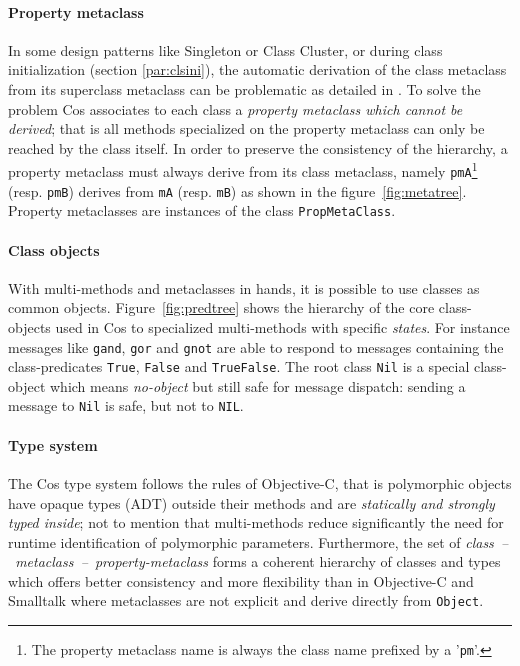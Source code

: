 \documentclass[preprint,10pt]{sigplanconf}
\newcommand{\ProgLang}[1]{{\sc #1}\xspace}
\newcommand{\Cos}       {\ProgLang{Cos}}
\newcommand{\Objc}      {\ProgLang{Objective-C}}
\newcommand{\Smalltalk} {\ProgLang{Smalltalk}}
\newcommand{\code}[1]{\lstinline[language=COS,style=samplecode]|#1|}
\begin{document}
\paragraph{Property metaclass}

In some design patterns like Singleton or Class Cluster, or during class initialization (section \ref{par:clsini}), the automatic derivation of the class metaclass from its superclass metaclass can be problematic as detailed in \cite{bour98}. To solve the problem \Cos associates to each class a {\em property metaclass which cannot be derived}; that is all methods specialized on the property metaclass can only be reached by the class itself. In order to preserve the consistency of the hierarchy, a property metaclass must always derive from its class metaclass, namely \code{pmA}\footnote{The property metaclass name is always the class name prefixed by a '\code{pm}'.}  (resp. \code{pmB}) derives from \code{mA} (resp. \code{mB}) as shown in the figure~\ref{fig:metatree}. Property metaclasses are instances of the class \code{PropMetaClass}.

\paragraph{Class objects}

With multi-methods and metaclasses in hands, it is possible to use classes as common objects. Figure~\ref{fig:predtree} shows the hierarchy of the core class-objects used in \Cos to specialized multi-methods with specific {\em states}. For instance messages like \code{gand}, \code{gor} and \code{gnot} are able to respond to messages containing the class-predicates \code{True}, \code{False} and \code{TrueFalse}. The root class \code{Nil} is a special class-object which means {\em no-object} but still safe for message dispatch: sending a message to \code{Nil} is safe, but not to \code{NIL}.

\paragraph{Type system}

The \Cos type system follows the rules of \Objc, that is polymorphic objects have opaque types (ADT) outside their methods and are {\em statically and strongly typed inside}; not to mention that multi-methods reduce significantly the need for runtime identification of polymorphic parameters. Furthermore, the set of {\em class~--~metaclass~--~property-metaclass} forms a coherent hierarchy of classes and types which offers better consistency and more flexibility than in \Objc and \Smalltalk where metaclasses are not explicit and derive directly from \code{Object}.
\end{document}
